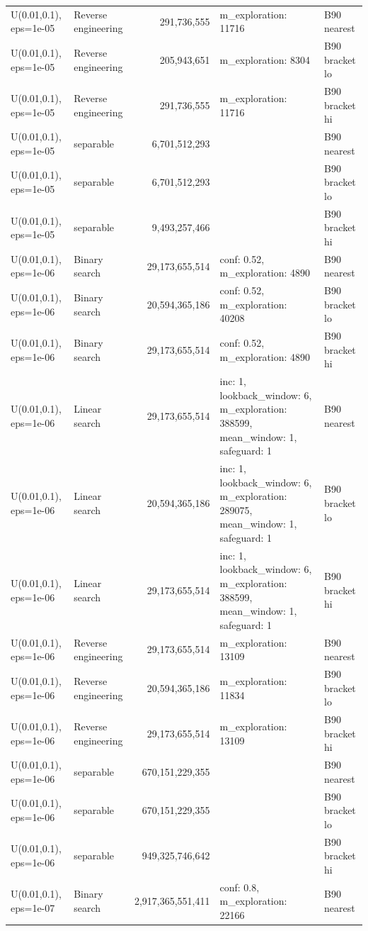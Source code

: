 \begin{tabular}{llrll}
U(0.01,0.1), eps=1e-05 & Reverse engineering & 291,736,555 & m\_exploration: 11716 & B90 nearest \\
U(0.01,0.1), eps=1e-05 & Reverse engineering & 205,943,651 & m\_exploration: 8304 & B90 bracket lo \\
U(0.01,0.1), eps=1e-05 & Reverse engineering & 291,736,555 & m\_exploration: 11716 & B90 bracket hi \\
U(0.01,0.1), eps=1e-05 & separable & 6,701,512,293 &  & B90 nearest \\
U(0.01,0.1), eps=1e-05 & separable & 6,701,512,293 &  & B90 bracket lo \\
U(0.01,0.1), eps=1e-05 & separable & 9,493,257,466 &  & B90 bracket hi \\
U(0.01,0.1), eps=1e-06 & Binary search & 29,173,655,514 & conf: 0.52, m\_exploration: 4890 & B90 nearest \\
U(0.01,0.1), eps=1e-06 & Binary search & 20,594,365,186 & conf: 0.52, m\_exploration: 40208 & B90 bracket lo \\
U(0.01,0.1), eps=1e-06 & Binary search & 29,173,655,514 & conf: 0.52, m\_exploration: 4890 & B90 bracket hi \\
U(0.01,0.1), eps=1e-06 & Linear search & 29,173,655,514 & inc: 1, lookback\_window: 6, m\_exploration: 388599, mean\_window: 1, safeguard: 1 & B90 nearest \\
U(0.01,0.1), eps=1e-06 & Linear search & 20,594,365,186 & inc: 1, lookback\_window: 6, m\_exploration: 289075, mean\_window: 1, safeguard: 1 & B90 bracket lo \\
U(0.01,0.1), eps=1e-06 & Linear search & 29,173,655,514 & inc: 1, lookback\_window: 6, m\_exploration: 388599, mean\_window: 1, safeguard: 1 & B90 bracket hi \\
U(0.01,0.1), eps=1e-06 & Reverse engineering & 29,173,655,514 & m\_exploration: 13109 & B90 nearest \\
U(0.01,0.1), eps=1e-06 & Reverse engineering & 20,594,365,186 & m\_exploration: 11834 & B90 bracket lo \\
U(0.01,0.1), eps=1e-06 & Reverse engineering & 29,173,655,514 & m\_exploration: 13109 & B90 bracket hi \\
U(0.01,0.1), eps=1e-06 & separable & 670,151,229,355 &  & B90 nearest \\
U(0.01,0.1), eps=1e-06 & separable & 670,151,229,355 &  & B90 bracket lo \\
U(0.01,0.1), eps=1e-06 & separable & 949,325,746,642 &  & B90 bracket hi \\
U(0.01,0.1), eps=1e-07 & Binary search & 2,917,365,551,411 & conf: 0.8, m\_exploration: 22166 & B90 nearest \\

\end{tabular}
